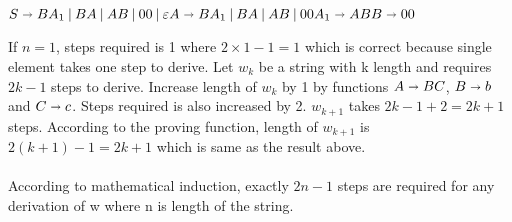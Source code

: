 \documentclass[12pt]{article}
\newenvironment{problem}[2][Problem]{\begin{trivlist}
\item[\hskip \labelsep {\bfseries #1}\hskip \labelsep {\bfseries #2.}]}{\end{trivlist}}
\begin{document}
\begin{problem}{2.14}
\end{problem}
	$
	S \shortrightarrow BA_1 \: | \: BA \: | \: AB \: | \: 00 \: | \: \varepsilon	\\
	A \shortrightarrow BA_1 \: | \: BA \: | \: AB \: | \: 00	\\
	A_1 \shortrightarrow AB	\\
	B \shortrightarrow 00
	$

\begin{problem}{2.26}
\end{problem}
\hspace*{5mm} If $n=1$, steps required is 1 where $2 \times 1-1=1$ which is correct because single element takes one step to derive. Let $w_k$ be a string with k length and requires $2k-1$ steps to derive. Increase length of $w_k$ by 1 by functions $A \shortrightarrow BC$, $B \shortrightarrow b$ and $C \shortrightarrow c$. Steps required is also increased by 2. $w_{k+1}$ takes $2k-1+2=2k+1$ steps. According to the proving function, length of $w_{k+1}$ is $2(k+1)-1=2k+1$ which is same as the result above. \\ \\
\hspace*{5mm} According to mathematical induction, exactly $2n-1$ steps are required for any derivation of w where n is length of the string. 
\end{document}
